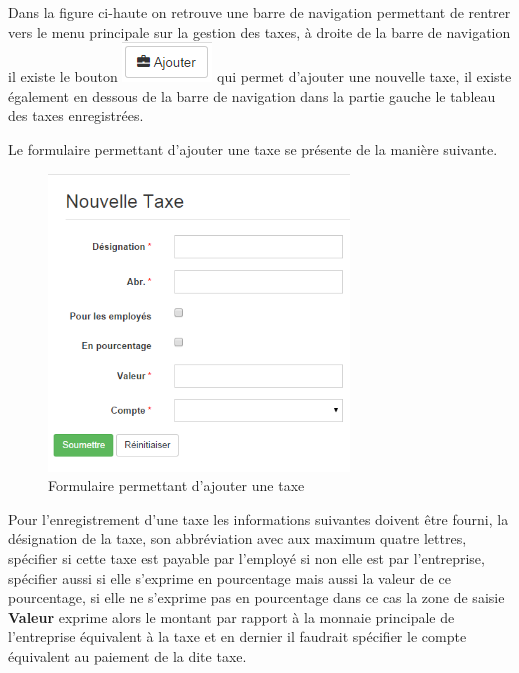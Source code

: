 \documentclass[12pt,a4paper]{report}
\begin{document}
Dans la figure ci-haute on retrouve une barre de navigation permettant de rentrer vers le menu principale sur la gestion des taxes, à droite de la barre de navigation il existe le bouton \includegraphics[scale=1]{pic/AddTaxe.png} qui permet d'ajouter une nouvelle taxe, il existe également en dessous de la barre de navigation dans la partie gauche le tableau des taxes enregistrées.

Le formulaire permettant d'ajouter une taxe se présente de la manière suivante. 

\begin{figure}[h]
\begin{center}
\includegraphics[width=8cm]{pic/NouvTaxe.png}
\end{center}
\caption{Formulaire permettant d'ajouter une taxe}
\label{Formulaire permettant d'ajouter une taxe}
\end{figure} 

Pour l'enregistrement d'une taxe les informations suivantes doivent être fourni, la désignation de la taxe, son abbréviation avec aux maximum quatre lettres, spécifier si cette taxe est payable par l'employé si non elle est par l'entreprise, spécifier aussi si elle s'exprime en pourcentage mais aussi la valeur de ce pourcentage, si elle ne s'exprime pas en pourcentage dans ce cas la zone de saisie \textbf{Valeur} exprime alors le montant par rapport à la monnaie principale de l'entreprise équivalent à la taxe et en dernier il faudrait spécifier le compte équivalent au paiement de la dite taxe. 
\end{document}
